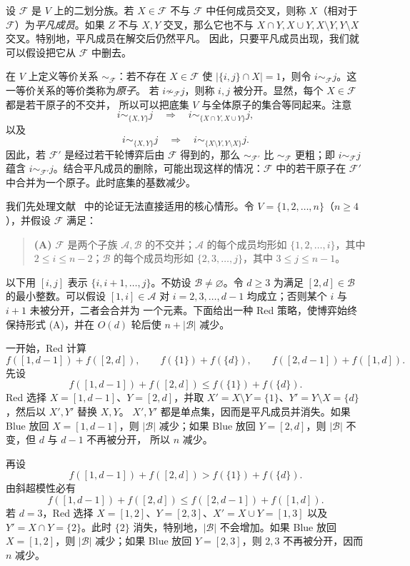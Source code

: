 \documentclass[UTF8,11pt,a4paper]{ctexart}
\numberwithin{equation}{section}
\newcommand{\calF}{\mathcal F}
\newcommand{\calA}{\mathcal A}
\newcommand{\calB}{\mathcal B}
\begin{document}
设 $\calF$ 是 $V$ 上的二划分族。若 $X\in\calF$ 不与 $\calF$ 中任何成员交叉，则称
$X$（相对于 $\calF$）为\emph{平凡成员}。如果 $Z$ 不与 $X,Y$ 交叉，那么它也不与
$X\cap Y,X\cup Y,X\setminus Y,Y\setminus X$ 交叉。特别地，平凡成员在解交后仍然平凡。
因此，只要平凡成员出现，我们就可以假设把它从 $\calF$ 中删去。

在 $V$ 上定义等价关系 $\sim_{\calF}$：若不存在 $X\in\calF$ 使
$|\{i,j\}\cap X|=1$，则令 $i\sim_{\calF}j$。这一等价关系的等价类称为\emph{原子}。
若 $i\not\sim_{\calF}j$，则称 $i,j$ 被分开。显然，每个 $X\in\calF$ 都是若干原子的不交并，
所以可以把底集 $V$ 与全体原子的集合等同起来。注意
\[
i\sim_{\{X,Y\}}j\quad\Longrightarrow\quad i\sim_{\{X\cap Y,X\cup Y\}}j,
\]
以及
\[
i\sim_{\{X,Y\}}j\quad\Longrightarrow\quad i\sim_{\{X\setminus Y,Y\setminus X\}}j.
\]
因此，若 $\calF'$ 是经过若干轮博弈后由 $\calF$ 得到的，那么
$\sim_{\calF'}$ 比 $\sim_{\calF}$ 更粗；即 $i\sim_{\calF}j$ 蕴含
$i\sim_{\calF'}j$。结合平凡成员的删除，可能出现这样的情况：$\calF$ 中的若干原子在
$\calF'$ 中合并为一个原子。此时底集的基数减少。

我们先处理文献~\cite{Karzanov} 中的论证无法直接适用的核心情形。令
$V=\{1,2,\ldots,n\}$（$n\ge4$），并假设 $\calF$ 满足：

\begin{quote}
\textbf{(A)} $\calF$ 是两个子族 $\calA,\calB$ 的不交并；$\calA$ 的每个成员均形如
$\{1,2,\ldots,i\}$，其中 $2\le i\le n-2$；$\calB$ 的每个成员均形如
$\{2,3,\ldots,j\}$，其中 $3\le j\le n-1$。
\end{quote}

以下用 $[i,j]$ 表示 $\{i,i+1,\ldots,j\}$。不妨设 $\calB\ne\varnothing$。令
$d\ge3$ 为满足 $[2,d]\in\calB$ 的最小整数。可以假设
$[1,i]\in\calA$ 对 $i=2,3,\ldots,d-1$ 均成立；否则某个 $i$ 与 $i+1$ 未被分开，二者会合并为
一个元素。下面给出一种 Red 策略，使博弈始终保持形式 (A)，并在 $O(d)$ 轮后使
$n+|\calB|$ 减少。

一开始，Red 计算
\[
f([1,d-1])+f([2,d]),\qquad f(\{1\})+f(\{d\}),\qquad
f([2,d-1])+f([1,d]).
\]
先设
\[
f([1,d-1])+f([2,d])\le f(\{1\})+f(\{d\}).
\]
Red 选择 $X=[1,d-1]$、$Y=[2,d]$，并取
$X'=X\setminus Y=\{1\}$、$Y'=Y\setminus X=\{d\}$，然后以 $X',Y'$ 替换 $X,Y$。
$X',Y'$ 都是单点集，因而是平凡成员并消失。如果 Blue 放回 $X=[1,d-1]$，则
$|\calB|$ 减少；如果 Blue 放回 $Y=[2,d]$，则 $|\calB|$ 不变，但 $d$ 与 $d-1$ 不再被分开，
所以 $n$ 减少。

再设
\[
f([1,d-1])+f([2,d])>f(\{1\})+f(\{d\}).
\]
由斜超模性必有
\[
f([1,d-1])+f([2,d])\le f([2,d-1])+f([1,d]).
\]
若 $d=3$，Red 选择 $X=[1,2]$、$Y=[2,3]$、$X'=X\cup Y=[1,3]$ 以及
$Y'=X\cap Y=\{2\}$。此时 $\{2\}$ 消失，特别地，$|\calB|$ 不会增加。如果 Blue 放回
$X=[1,2]$，则 $|\calB|$ 减少；如果 Blue 放回 $Y=[2,3]$，则 $2,3$ 不再被分开，因而
$n$ 减少。
\end{document}
